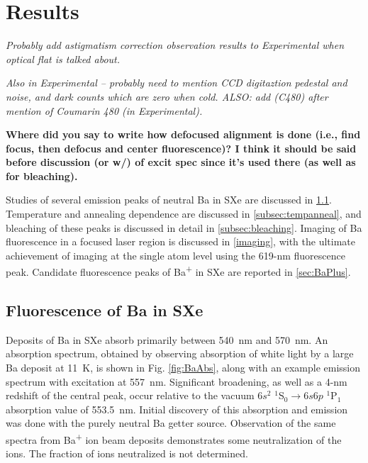 \chapter{Results}

\emph{\color{gray}Probably add astigmatism correction observation results to Experimental when optical flat is talked about.}

\emph{\color{gray}Also in Experimental -- probably need to mention CCD digitaztion pedestal and noise, and dark counts which are zero when cold.  ALSO:  add (C480) after mention of Coumarin 480 (in Experimental).}

\textbf{\color{red}Where did you say to write how defocused alignment is done (i.e., find focus, then defocus and center fluorescence)?  I think it should be said before discussion (or w/) of excit spec since it's used there (as well as for bleaching).}

Studies of several emission peaks of neutral Ba in SXe are discussed in \ref{sec:fluorescence}.  Temperature and annealing dependence are discussed in \ref{subsec:tempanneal}, and bleaching of these peaks is discussed in detail in \ref{subsec:bleaching}.  Imaging of Ba fluorescence in a focused laser region is discussed in \ref{imaging}, with the ultimate achievement of imaging at the single atom level using the 619-nm fluorescence peak.  Candidate fluorescence peaks of Ba\textsuperscript{+} in SXe are reported in \ref{sec:BaPlus}.

\section{Fluorescence of Ba in SXe}
\label{sec:fluorescence}

Deposits of Ba in SXe absorb primarily between 540~nm and 570~nm.  An absorption spectrum, obtained by observing absorption of white light by a large Ba deposit at 11~K, is shown in Fig. \ref{fig:BaAbs}, along with an example emission spectrum with excitation at 557~nm.  Significant broadening, as well as a 4-nm redshift  of the central peak, occur relative to the vacuum $6s^{2}$ $^{1}$S$_{0} \rightarrow 6s6p$ $^{1}$P$_{1}$ absorption value of 553.5~nm.  Initial discovery of this absorption and emission was done with the purely neutral Ba getter source.  Observation of the same spectra from Ba\textsuperscript{+} ion beam deposits demonstrates some neutralization of the ions.  The fraction of ions neutralized is not determined.  \cite{Mong2015,Shon,Brian}

